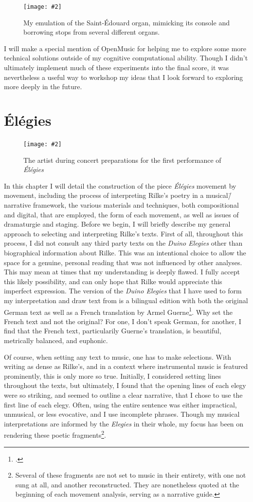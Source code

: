 \documentclass[12pt,twoside,maitrise]{dms_ks}
\newcommand{\customincludegraphics}[4][]{%
    \begin{figure}[H]
        \centering
        \texttt{[image: \#2]}
        \caption{#4}
	\label{#3} 
    \end{figure}
}
\theoremstyle{definition}
\begin{document}
{\customincludegraphics[scale=0.3]{grand_orgue}{fig:grand_orgue}{My emulation of the Saint-Édouard organ, mimicking its console and borrowing stops from several different organs.}

I will make a special mention of OpenMusic for helping me to explore some more technical solutions outside of my cognitive computational ability. 
Though I didn't ultimately implement much of these experiments into the final score, it was nevertheless a useful way to workshop my ideas that I look forward to exploring more deeply in the future.

\chapter{Élégies}

\customincludegraphics[scale=0.2]{2024-04-28_MH}{fig:live}{The artist during concert preparations for the first performance of \textit{Élégies}}

In this chapter I will detail the construction of the piece \textit{Élégies} movement by movement, including the process of interpreting Rilke's poetry in a musical\=/narrative framework, the various materials and techniques, both compositional and digital, that are employed, the form of each movement, as well as issues of dramaturgie and staging. Before we begin, I will briefly describe my general approach to selecting and interpreting Rilke's texts. First of all, throughout this process, I did not consult any third party texts on the \textit{Duino Elegies} other than biographical information about Rilke. This was an intentional choice to allow the space for a genuine, personal reading that was not influenced by other analyses. This may mean at times that my understanding is deeply flawed. I fully accept this likely possibility, and can only hope that Rilke would appreciate this imperfect expression. The version of the \textit{Duino Elegies} that I have used to form my interpretation and draw text from is a bilingual edition with both the original German text as well as a French translation by Armel Guerne\footcite{rilke_egies_1986}. Why set the French text and not the original? For one, I don't speak German, for another, I find that the French text, particularily Guerne's translation, is beautiful, metrically balanced, and euphonic.   

Of course, when setting any text to music, one has to make selections. 
With writing as dense as Rilke's, and in a context where instrumental music is featured prominently, this is only more so true. 
Initially, I considered setting lines throughout the texts, but ultimately, I found that the opening lines of each elegy were so striking, and seemed to outline a clear narrative, that I chose to use the first line of each elegy. 
Often, using the entire sentence was either impractical, unmusical, or less evocative, and I use incomplete phrases. 
Though my musical interpretations are informed by the \textit{Elegies} in their whole, my focus has been on rendering these poetic fragments\footnote{Several of these fragments are not set to music in their entirety, with one not sung at all, and another reconstructed. They are nonetheless quoted at the beginning of each movement analysis, serving as a narrative guide.}. 

}
\end{document}
